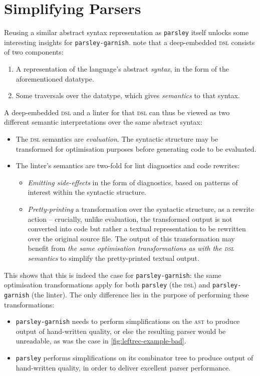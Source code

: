 \documentclass[../../../main.tex]{subfiles}
\begin{document}
\section{Simplifying Parsers}\label{sec:simplify-parsers}

Reusing a similar abstract syntax representation as \texttt{parsley} itself unlocks some interesting insights for \texttt{parsley-garnish}.
\textcite{gibbons_dsls_2014} note that a deep-embedded \textsc{dsl} consists of two components:
\begin{enumerate}
  \item A representation of the language's abstract \emph{syntax}, in the form of the aforementioned datatype.
  \item Some traversals over the datatype, which gives \emph{semantics} to that syntax.
\end{enumerate}
%
A deep-embedded \textsc{dsl} and a linter for that \textsc{dsl} can thus be viewed as two different semantic interpretations over the same abstract syntax:
\begin{itemize}
  \item The \textsc{dsl} semantics are \emph{evaluation}. The syntactic structure may be transformed for optimisation purposes before generating code to be evaluated. %
  \item The linter's semantics are two-fold for lint diagnostics and code rewrites:
  \begin{itemize}
    \item \emph{Emitting side-effects} in the form of diagnostics, based on patterns of interest within the syntactic structure.
    \item \emph{Pretty-printing} a transformation over the syntactic structure, as a rewrite action -- crucially, unlike evaluation, the transformed output is not converted into code but rather a textual representation to be rewritten over the original source file. The output of this transformation may benefit from \emph{the same optimisation transformations as with the \textsc{dsl} semantics} to simplify the pretty-printed textual output.
  \end{itemize}
\end{itemize}
%
This  shows that this is indeed the case for \texttt{parsley-garnish}:
the same optimisation transformations apply for both \texttt{parsley} (the \textsc{dsl}) and \texttt{parsley-garnish} (the linter).
The only difference lies in the purpose of performing these transformations:
\begin{itemize}
  \item \texttt{parsley-garnish} needs to perform simplifications on the  \textsc{ast} to produce output of hand-written quality, or else the resulting parser would be unreadable, as was the case in \cref{fig:leftrec-example-bad}.
  \item \texttt{parsley} performs simplifications on its combinator tree to produce output of hand-written quality, in order to deliver excellent parser performance.
\end{itemize}
\end{document}
